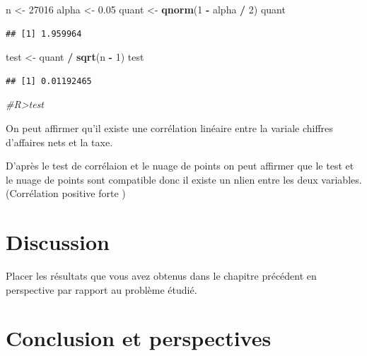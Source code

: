 \documentclass[mstat,12pt]{unswthesis}
\newenvironment{Shaded}{\begin{snugshade}}{\end{snugshade}}
\newcommand{\CommentTok}[1]{\textcolor[rgb]{0.56,0.35,0.01}{\textit{#1}}}
\newcommand{\DecValTok}[1]{\textcolor[rgb]{0.00,0.00,0.81}{#1}}
\newcommand{\FloatTok}[1]{\textcolor[rgb]{0.00,0.00,0.81}{#1}}
\newcommand{\FunctionTok}[1]{\textcolor[rgb]{0.13,0.29,0.53}{\textbf{#1}}}
\newcommand{\NormalTok}[1]{#1}
\newcommand{\OtherTok}[1]{\textcolor[rgb]{0.56,0.35,0.01}{#1}}
\newcommand{\SpecialCharTok}[1]{\textcolor[rgb]{0.81,0.36,0.00}{\textbf{#1}}}
\begin{document}
\medskip

\begin{Shaded}
\begin{Highlighting}[]
\NormalTok{n }\OtherTok{\textless{}{-}} \DecValTok{27016}
\NormalTok{alpha }\OtherTok{\textless{}{-}} \FloatTok{0.05}
\NormalTok{quant }\OtherTok{\textless{}{-}} \FunctionTok{qnorm}\NormalTok{(}\DecValTok{1} \SpecialCharTok{{-}}\NormalTok{ alpha }\SpecialCharTok{/} \DecValTok{2}\NormalTok{)}
\NormalTok{quant}
\end{Highlighting}
\end{Shaded}

\begin{verbatim}
## [1] 1.959964
\end{verbatim}

\begin{Shaded}
\begin{Highlighting}[]
\NormalTok{test }\OtherTok{\textless{}{-}}\NormalTok{ quant }\SpecialCharTok{/} \FunctionTok{sqrt}\NormalTok{(n }\SpecialCharTok{{-}} \DecValTok{1}\NormalTok{)}
\NormalTok{test}
\end{Highlighting}
\end{Shaded}

\begin{verbatim}
## [1] 0.01192465
\end{verbatim}

\begin{Shaded}
\begin{Highlighting}[]
\CommentTok{\#R\textgreater{}test}
\end{Highlighting}
\end{Shaded}

\medskip

On peut affirmer qu'il existe une corrélation linéaire entre la variale
chiffres d'affaires nets et la taxe.

D'après le test de corrélaion et le nuage de points on peut affirmer que
le test et le nuage de points sont compatible donc il existe un nlien
entre les deux variables.(Corrélation positive forte )

\chapter{Discussion}\label{discussion}

Placer les résultats que vous avez obtenus dans le chapitre précédent en
perspective par rapport au problème étudié.

\chapter{Conclusion et perspectives}\label{conclusion-et-perspectives}
\end{document}
